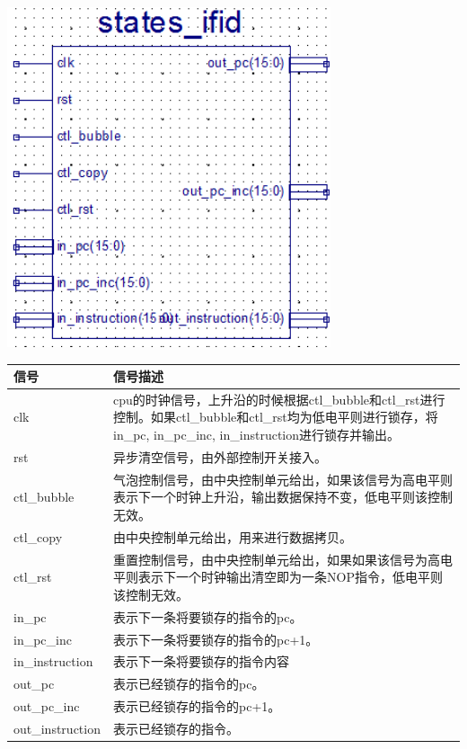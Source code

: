 \begin{center}
    \includegraphics[height=10cm]{image/detail/detail_ifid.png}
    \label{fig:ifid}
\end{center}

\begin{center}
    \label{table:ifid}
    \begin{longtable}{p{}p{}}
        \toprule
        信号 & 信号描述 \\
        \midrule
        clk & cpu的时钟信号，上升沿的时候根据ctl\_bubble和ctl\_rst进行控制。如果ctl\_bubble和ctl\_rst均为低电平则进行锁存，将in\_pc, in\_pc\_inc, in\_instruction进行锁存并输出。 \\
        rst & 异步清空信号，由外部控制开关接入。 \\
        ctl\_bubble & 气泡控制信号，由中央控制单元给出，如果该信号为高电平则表示下一个时钟上升沿，输出数据保持不变，低电平则该控制无效。 \\
        ctl\_copy &  由中央控制单元给出，用来进行数据拷贝。\\
        ctl\_rst & 重置控制信号，由中央控制单元给出，如果如果该信号为高电平则表示下一个时钟输出清空即为一条NOP指令，低电平则该控制无效。 \\
        in\_pc & 表示下一条将要锁存的指令的pc。 \\
        in\_pc\_inc & 表示下一条将要锁存的指令的pc+1。 \\
        in\_instruction & 表示下一条将要锁存的指令内容 \\
        out\_pc & 表示已经锁存的指令的pc。 \\
        out\_pc\_inc & 表示已经锁存的指令的pc+1。 \\
        out\_instruction & 表示已经锁存的指令。 \\
        \bottomrule
    \end{longtable}
\end{center}

